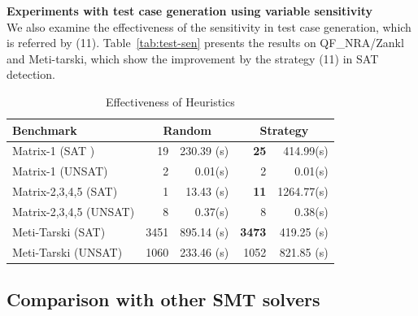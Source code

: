 \documentclass[runningheads,a4paper,oribibl]{llncs}
\begin{document}

\noindent
{\bf Experiments with test case generation using variable sensitivity} \\
%
We also examine the effectiveness of the sensitivity in test case generation, 
which is referred by (11).
Table~\ref{tab:test-sen} presents the results on QF\_NRA/Zankl and Meti-tarski, 
which show the improvement by the strategy (11) in SAT detection. 



\begin{table}[ht]
\begin{center}
\begin{tabular}{ | l | r | r | r | r |}
\hline
    \multicolumn{1}{|l|}{Benchmark} & \multicolumn{2}{c|}{Random} &
    \multicolumn{2}{c|}{Strategy} \\
\hline
    Matrix-1 (SAT ) & 19 & 230.39 (s) & \textbf{25} & 414.99(s)
\\
\hline
    Matrix-1 (UNSAT) & 2 & 0.01(s) & 2 & 0.01(s)
\\
\hline
	Matrix-2,3,4,5 (SAT) & 1 & 13.43 (s) & \textbf{11} & 1264.77(s)
\\
\hline
    Matrix-2,3,4,5 (UNSAT) & 8 & 0.37(s) & 8 & 0.38(s)
\\ \hline
    Meti-Tarski (SAT) & 3451 & 895.14 (s) & \textbf{3473} & 419.25 (s)
\\
\hline
    Meti-Tarski (UNSAT) & 1060 & 233.46 (s) & 1052 & 821.85 (s)
\\
\hline
\end{tabular}
\end{center}
\caption{Effectiveness of Heuristics} 
\label{tab:rasat-experiments}
\end{table}


\vspace{-1cm}


\subsection{Comparison with other SMT solvers}
\end{document}
